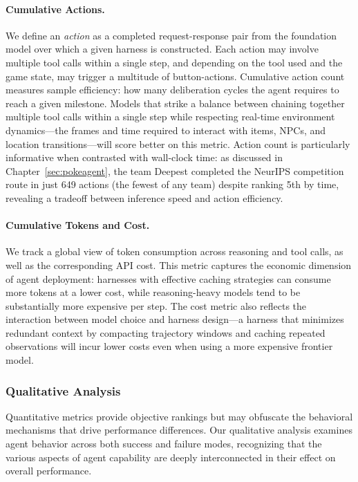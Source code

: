 \paragraph{Cumulative Actions.} We define an \emph{action} as a completed request-response pair from the foundation model over which a given harness is constructed. Each action may involve multiple tool calls within a single step, and depending on the tool used and the game state, may trigger a multitude of button-actions. Cumulative action count measures sample efficiency: how many deliberation cycles the agent requires to reach a given milestone. Models that strike a balance between chaining together multiple tool calls within a single step while respecting real-time environment dynamics---the frames and time required to interact with items, NPCs, and location transitions---will score better on this metric. Action count is particularly informative when contrasted with wall-clock time: as discussed in Chapter~\ref{sec:pokeagent}, the team Deepest completed the NeurIPS competition route in just 649 actions (the fewest of any team) despite ranking 5th by time, revealing a tradeoff between inference speed and action efficiency.

\paragraph{Cumulative Tokens and Cost.} We track a global view of token consumption across reasoning and tool calls, as well as the corresponding API cost. This metric captures the economic dimension of agent deployment: harnesses with effective caching strategies can consume more tokens at a lower cost, while reasoning-heavy models tend to be substantially more expensive per step. The cost metric also reflects the interaction between model choice and harness design---a harness that minimizes redundant context by compacting trajectory windows and caching repeated observations will incur lower costs even when using a more expensive frontier model.

\subsubsection{Qualitative Analysis}\label{sec:qualitative_analysis}

Quantitative metrics provide objective rankings but may obfuscate the behavioral mechanisms that drive performance differences. Our qualitative analysis examines agent behavior across both success and failure modes, recognizing that the various aspects of agent capability are deeply interconnected in their effect on overall performance.


